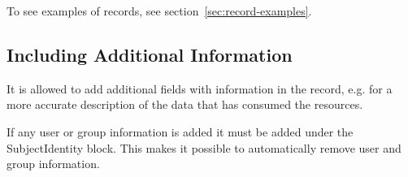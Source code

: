 To see examples of records, see section~\ref{sec:record-examples}.


\subsection{Including Additional Information}

It is allowed to add additional fields with information in the record, e.g.
for a more accurate description of the data that has consumed the resources.

If any user or group information is added it must be added under the
SubjectIdentity block. This makes it possible to automatically remove user
and group information.


